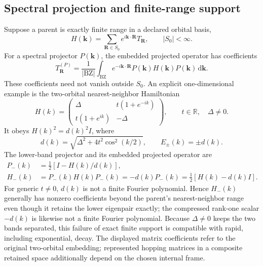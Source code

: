 \documentclass[11pt]{article}
\begin{document}
\subsection{Spectral projection and finite-range support}\label{supp:projection-locality}
Suppose a parent is exactly finite range in a declared orbital basis,
\begin{equation}\label{eq:finite-range-parent}
H(\bm k)=\sum_{\bm R\in S_0}e^{i\bm k\cdot\bm R}T_{\bm R},
\qquad |S_0|<\infty.
\end{equation}
For a spectral projector $P(\bm k)$, the embedded projected operator has coefficients
\begin{equation}\label{eq:projected-hopping}
T^{(P)}_{\bm R}=\frac{1}{|\mathrm{BZ}|}\int_{\mathrm{BZ}}e^{-i\bm k\cdot\bm R}P(\bm k)H(\bm k)P(\bm k)\,\mathrm{d}\bm k.
\end{equation}
These coefficients need not vanish outside $S_0$. An explicit one-dimensional example is the two-orbital nearest-neighbor Hamiltonian
\begin{equation}\label{eq:projection-two-band}
H(k)=\begin{pmatrix}
\Delta&t(1+e^{-ik})\\
t(1+e^{ik})&-\Delta
\end{pmatrix},
\qquad t\in\mathbb R,\quad \Delta\ne0.
\end{equation}
It obeys $H(k)^2=d(k)^2I$, where
\begin{equation}\label{eq:projection-dispersion}
d(k)=\sqrt{\Delta^2+4t^2\cos^2(k/2)},
\qquad E_\pm(k)=\pm d(k).
\end{equation}
The lower-band projector and its embedded projected operator are
\begin{align}
P_-(k)&=\tfrac12\left[I-H(k)/d(k)\right],\\
H_-(k)&=P_-(k)H(k)P_-(k)
      =-d(k)P_-(k)
      =\tfrac12\left[H(k)-d(k)I\right].\label{eq:projection-counterexample}
\end{align}
For generic $t\ne0$, $d(k)$ is not a finite Fourier polynomial. Hence $H_-(k)$ generally has nonzero coefficients beyond the parent's nearest-neighbor range even though it retains the lower eigenpair exactly; the compressed rank-one scalar $-d(k)$ is likewise not a finite Fourier polynomial. Because $\Delta\ne0$ keeps the two bands separated, this failure of exact finite support is compatible with rapid, including exponential, decay. The displayed matrix coefficients refer to the original two-orbital embedding; represented hopping matrices in a composite retained space additionally depend on the chosen internal frame.
\end{document}
